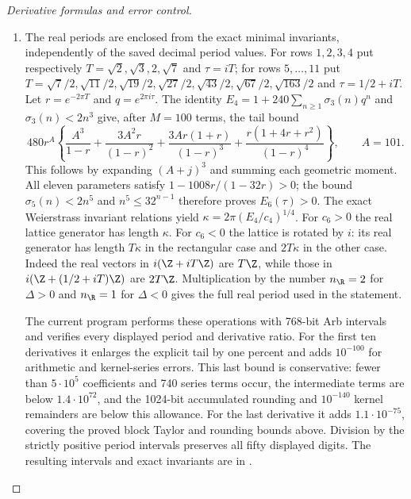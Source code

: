 \begin{proof}[Derivative formulas and error control]
\begin{enumerate}[label=\arabic*.,leftmargin=*]
\item The real periods are enclosed from the exact minimal invariants,
independently of the saved decimal period values.  For rows $1,2,3,4$
put respectively $T=\sqrt2,\sqrt3,2,\sqrt7$ and $\tau=iT$;
for rows $5,\ldots,11$ put
$T=\sqrt{7}/2,\sqrt{11}/2,\sqrt{19}/2,\sqrt{27}/2,
\sqrt{43}/2,\sqrt{67}/2,\sqrt{163}/2$ and $\tau=1/2+iT$.
Let $r=e^{-2\pi T}$ and $q=e^{2\pi i\tau}$.  The identity
$E_4=1+240\sum_{n\geq1}\sigma_3(n)q^n$ and
$\sigma_3(n)<2n^3$ give, after $M=100$ terms, the tail bound
\[
480r^{A}\left\{
\frac{A^3}{1-r}+\frac{3A^2r}{(1-r)^2}
+\frac{3Ar(1+r)}{(1-r)^3}
+\frac{r(1+4r+r^2)}{(1-r)^4}\right\},\qquad A=101.
\]
This follows by expanding $(A+j)^3$ and summing each geometric
moment.  All eleven parameters satisfy
$1-1008r/(1-32r)>0$; the bound
$\sigma_5(n)<2n^5$ and $n^5\leq32^{n-1}$ therefore proves
$E_6(\tau)>0$.  The exact Weierstrass invariant relations yield
$\kappa=2\pi(E_4/c_4)^{1/4}$.  For $c_6>0$ the real lattice
generator has length $\kappa$.  For $c_6<0$ the lattice is rotated
by $i$: its real generator has length $T\kappa$ in the rectangular
case and $2T\kappa$ in the other case.  Indeed the real vectors in
$i(\Z+iT\Z)$ are $T\Z$, while those in
$i(\Z+(1/2+iT)\Z)$ are $2T\Z$.  Multiplication by the number
$n_{\R}=2$ for $\Delta>0$ and $n_{\R}=1$ for $\Delta<0$
gives the full real period used in the statement.

The current program 
performs these operations with 768-bit Arb intervals and verifies
every displayed period and derivative ratio.  For the first ten
derivatives it enlarges the explicit tail by one percent and adds
$10^{-100}$ for arithmetic and kernel-series errors.  This last
bound is conservative: fewer than $5\cdot10^5$ coefficients and
740 series terms occur, the intermediate terms are below
$1.4\cdot10^{72}$, and the 1024-bit accumulated rounding and
$10^{-140}$ kernel remainders are below this allowance.
For the last derivative it adds $1.1\cdot10^{-75}$, covering the
proved block Taylor and rounding bounds above.  Division by the
strictly positive period intervals preserves all fifty displayed
digits.  The resulting intervals and exact invariants are in
.


\end{enumerate}
\end{proof}

